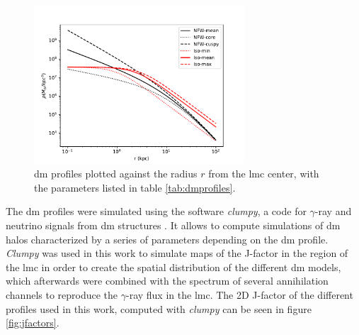 \documentclass[main.tex]{subfiles}
\begin{document}
\begin{figure}[h!]
  \centering
  \includegraphics[width=0.7\textwidth]{Pictures/dmprofiles.pdf}
  \caption{\gls{dm} profiles plotted against the radius $r$ from the \gls{lmc} center, with the parameters listed in table \ref{tab:dmprofiles}.} \label{fig:dmprofiles}
\end{figure}

\begin{table}
  \centering
    \caption{Parameters of the \gls{dm} profiles used in this work. Values of NFW-mean and Iso-mean profiles are the same as of \cite{2015FermiLMCDM}. The $J$-factors are integrated over 10º from the halo center.} \label{tab:dmprofiles}
\end{table}

The \gls{dm} profiles were simulated using the software \textit{clumpy}, a code for $\gamma$-ray and neutrino signals from \gls{dm} structures \cite{2019CLUMPY}. It allows to compute simulations of \gls{dm} halos characterized by a series of parameters depending on the \gls{dm} profile. \textit{Clumpy} was used in this work to simulate maps of the J-factor in the region of the \gls{lmc} in order to create the spatial distribution of the different \gls{dm} models, which afterwards were combined with the spectrum of several annihilation channels to reproduce the $\gamma$-ray flux in the \gls{lmc}. The 2D J-factor of the different profiles used in this work, computed with \textit{clumpy} can be seen in figure \ref{fig:jfactors}.
\end{document}
